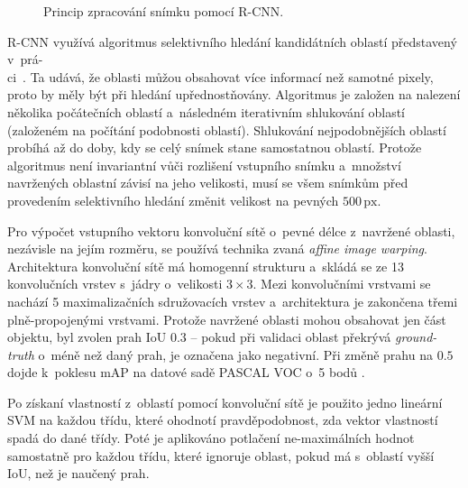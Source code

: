 \begin{figure}[H]
    \centering
    \caption{Princip zpracování snímku pomocí R-CNN.\footnotemark}
    \label{fig:rcnn}
\end{figure}


R-CNN využívá algoritmus selektivního hledání kandidátních oblastí představený v~prá-\\ci~\cite{selective-search}. Ta udává, že oblasti můžou obsahovat více informací než samotné pixely, proto by měly být při hledání upřednostňovány. Algoritmus je založen na nalezení několika počátečních oblastí a~následném iterativním shlukování oblastí (založeném na počítání podobnosti oblastí). Shlukování nejpodobnějších oblastí probíhá až do doby, kdy se celý snímek stane samostatnou oblastí. Protože algoritmus není invariantní vůči rozlišení vstupního snímku a~množství navržených oblastní závisí na jeho velikosti, musí se všem snímkům před provedením selektivního hledání změnit velikost na pevných $500\,\text{px}$.

Pro výpočet vstupního vektoru konvoluční sítě o~pevné délce z~navržené oblasti, nezávisle na jejím rozměru, se používá technika zvaná \emph{affine image warping}\footnotemark. Architektura konvoluční sítě má homogenní strukturu a~skládá se ze 13 konvolučních vrstev s~jádry o~velikosti $3 \times 3$. Mezi konvolučními vrstvami se nachází 5 maximalizačních sdružovacích vrstev a~architektura je zakončena třemi plně-propojenými vrstvami. Protože navržené oblasti mohou obsahovat jen část objektu, byl zvolen prah IoU $0.3$ -- pokud při validaci oblast překrývá \emph{ground-truth} o~méně než daný prah, je označena jako negativní. Při změně prahu na $0.5$ dojde k~poklesu mAP na datové sadě PASCAL VOC o~5 bodů \cite{rcnn}.


Po získaní vlastností z~oblastí pomocí konvoluční sítě je použito jedno lineární SVM na každou třídu, které ohodnotí pravděpodobnost, zda vektor vlastností spadá do dané třídy. Poté je aplikováno potlačení ne-maximálních hodnot samostatně pro každou třídu, které ignoruje oblast, pokud má s~oblastí vyšší IoU, než je naučený prah.


